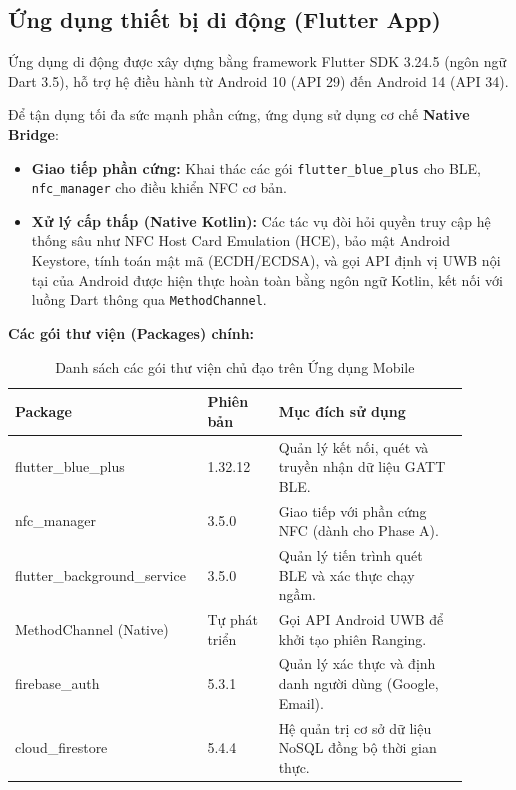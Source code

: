 \subsection{Ứng dụng thiết bị di động (Flutter App)}
Ứng dụng di động được xây dựng bằng framework Flutter SDK 3.24.5 (ngôn ngữ Dart 3.5), hỗ trợ hệ điều hành từ Android 10 (API 29) đến Android 14 (API 34).

Để tận dụng tối đa sức mạnh phần cứng, ứng dụng sử dụng cơ chế \textbf{Native Bridge}:
\begin{itemize}
    \item \textbf{Giao tiếp phần cứng:} Khai thác các gói \texttt{flutter\_blue\_plus} cho BLE, \texttt{nfc\_manager} cho điều khiển NFC cơ bản.
    \item \textbf{Xử lý cấp thấp (Native Kotlin):} Các tác vụ đòi hỏi quyền truy cập hệ thống sâu như NFC Host Card Emulation (HCE), bảo mật Android Keystore, tính toán mật mã (ECDH/ECDSA), và gọi API định vị UWB nội tại của Android được hiện thực hoàn toàn bằng ngôn ngữ Kotlin, kết nối với luồng Dart thông qua \texttt{MethodChannel}.
\end{itemize}

\textbf{Các gói thư viện (Packages) chính:}

\begin{table}[H]
    \centering
    \begin{tabular}{|p{0.35\linewidth}|p{0.15\linewidth}|p{0.4\linewidth}|}
        \hline
        \textbf{Package} & \textbf{Phiên bản} & \textbf{Mục đích sử dụng} \\
        \hline
        flutter\_blue\_plus & 1.32.12 & Quản lý kết nối, quét và truyền nhận dữ liệu GATT BLE. \\
        \hline
        nfc\_manager & 3.5.0 & Giao tiếp với phần cứng NFC (dành cho Phase A). \\
        \hline
        flutter\_background\_service & 3.5.0 & Quản lý tiến trình quét BLE và xác thực chạy ngầm. \\
        \hline
        MethodChannel (Native) & Tự phát triển & Gọi API Android UWB để khởi tạo phiên Ranging. \\
        \hline
        firebase\_auth & 5.3.1 & Quản lý xác thực và định danh người dùng (Google, Email). \\
        \hline
        cloud\_firestore & 5.4.4 & Hệ quản trị cơ sở dữ liệu NoSQL đồng bộ thời gian thực. \\
        \hline
    \end{tabular}
    \caption{Danh sách các gói thư viện chủ đạo trên Ứng dụng Mobile}
    \label{tab:flutter_libs}
\end{table}

